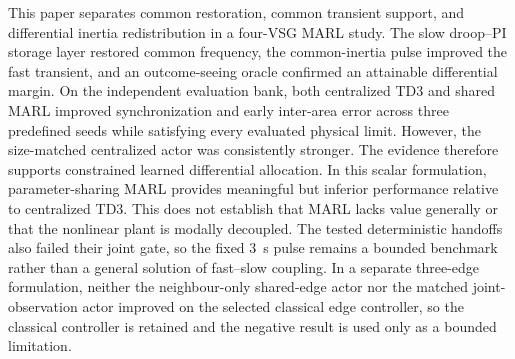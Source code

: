 \documentclass[conference,a4paper]{IEEEtran}
\begin{document}
This paper separates common restoration, common transient support, and
differential inertia redistribution in a four-VSG MARL study. The slow
droop--PI storage layer restored common frequency, the common-inertia pulse
improved the fast transient, and an outcome-seeing oracle confirmed an
attainable differential margin. On the independent evaluation bank, both
centralized TD3 and shared MARL improved synchronization and early inter-area
error across three predefined seeds while satisfying every evaluated physical
limit.
However, the size-matched centralized actor was consistently stronger. The
evidence therefore supports constrained learned differential allocation. In
this scalar formulation, parameter-sharing MARL provides meaningful but
inferior performance relative to centralized TD3. This does not establish
that MARL lacks value generally or that the nonlinear plant is modally
decoupled. The tested deterministic handoffs also failed their joint gate, so
the fixed \SI{3}{s} pulse remains a bounded benchmark rather than a general
solution of fast--slow coupling. In a separate three-edge formulation,
neither the neighbour-only shared-edge actor nor the matched joint-observation
actor improved on the selected classical edge controller, so the classical
controller is retained and the negative result is used only as a bounded
limitation.



\end{document}
